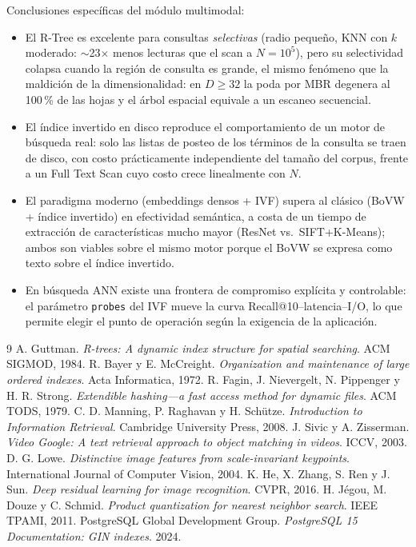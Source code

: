 \documentclass[11pt]{article}
\begin{document}
Conclusiones específicas del módulo multimodal:

\begin{itemize}
  \item El R-Tree es excelente para consultas \emph{selectivas} (radio
        pequeño, KNN con $k$ moderado: $\sim$23$\times$ menos lecturas
        que el scan a $N{=}10^5$), pero su selectividad colapsa cuando la
        región de consulta es grande, el mismo fenómeno que la maldición
        de la dimensionalidad: en $D \ge 32$ la poda por MBR degenera al
        100\,\% de las hojas y el árbol espacial equivale a un escaneo
        secuencial.
  \item El índice invertido en disco reproduce el comportamiento de un
        motor de búsqueda real: solo las listas de posteo de los términos
        de la consulta se traen de disco, con costo prácticamente
        independiente del tamaño del corpus, frente a un Full Text Scan
        cuyo costo crece linealmente con $N$.
  \item El paradigma moderno (embeddings densos + IVF) supera al clásico
        (BoVW + índice invertido) en efectividad semántica, a costa de un
        tiempo de extracción de características mucho mayor (ResNet vs.\
        SIFT+K-Means); ambos son viables sobre el mismo motor porque el
        BoVW se expresa como texto sobre el índice invertido.
  \item En búsqueda ANN existe una frontera de compromiso explícita y
        controlable: el parámetro \texttt{probes} del IVF mueve la curva
        Recall@10--latencia--I/O, lo que permite elegir el punto de
        operación según la exigencia de la aplicación.
\end{itemize}

\clearpage
{}
\renewcommand{\refname}{Referencias}
\begin{thebibliography}{9}
 A. Guttman. \emph{R-trees: A dynamic index structure
for spatial searching}. ACM SIGMOD, 1984.
 R. Bayer y E. McCreight. \emph{Organization and
maintenance of large ordered indexes}. Acta Informatica, 1972.
 R. Fagin, J. Nievergelt, N. Pippenger y H. R.
Strong. \emph{Extendible hashing---a fast access method for dynamic
files}. ACM TODS, 1979.
 C. D. Manning, P. Raghavan y H. Schütze.
\emph{Introduction to Information Retrieval}. Cambridge University
Press, 2008.
 J. Sivic y A. Zisserman. \emph{Video Google: A text
retrieval approach to object matching in videos}. ICCV, 2003.
 D. G. Lowe. \emph{Distinctive image features from
scale-invariant keypoints}. International Journal of Computer Vision,
2004.
 K. He, X. Zhang, S. Ren y J. Sun. \emph{Deep residual
learning for image recognition}. CVPR, 2016.
 H. Jégou, M. Douze y C. Schmid. \emph{Product
quantization for nearest neighbor search}. IEEE TPAMI, 2011.
 PostgreSQL Global Development Group. \emph{PostgreSQL
15 Documentation: GIN indexes}. 2024.
\end{thebibliography}
\end{document}
